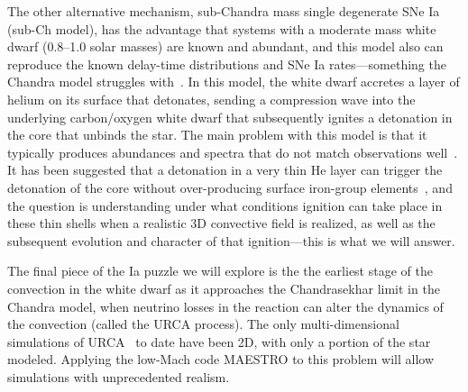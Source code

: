 The other alternative mechanism, sub-Chandra mass single degenerate SNe
Ia~\cite{fink:2010,shen:2010,sim:2012} (sub-Ch
model), has the advantage that systems with a moderate mass white dwarf
(0.8--1.0 solar masses) are known and abundant, and this model also can
reproduce the known delay-time distributions and SNe Ia
rates---something the Chandra model struggles with~\cite{ruiter:2011}.
In this model, the white dwarf accretes a layer
of helium on its surface that detonates, sending 
a compression wave into the
underlying carbon/oxygen white dwarf that subsequently 
ignites a detonation in the core that unbinds the star. The main
problem with this model is that it typically produces abundances
and spectra that do not match observations 
well~\cite{hoeflich:1996,nugent:1997,kromer:2010}.  
It has been suggested
that a detonation in a very thin He layer can trigger the detonation
of the core without over-producing surface iron-group
elements~\cite{fink:2010}, and the question is understanding under 
what conditions ignition can take
place in these thin shells when a realistic 3D convective field is
realized, as well as the subsequent evolution and character of that
ignition---this is what we will answer.

The final piece of the Ia puzzle we will explore is the 
the earliest stage of the convection in the white
dwarf as it approaches the Chandrasekhar limit in the Chandra
model, when neutrino losses in the reaction can alter the dynamics of
the convection (called the URCA process).  The only multi-dimensional
simulations of URCA~\cite{URCA} to date have been 2D, with only a
portion of the star modeled.  Applying the low-Mach code MAESTRO
to this problem will allow simulations with unprecedented realism.
